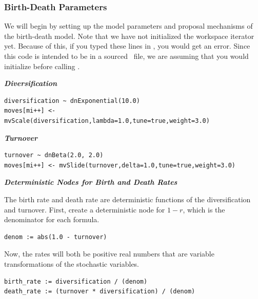 
\subsubsection{Birth-Death Parameters}

We will begin by setting up the model parameters and proposal mechanisms of the birth-death model. 
Note that we have not initialized the workspace iterator  yet. 
Because of this, if you typed these lines in \RevBayes, you would get an error. 
Since this code is intended to be in a sourced \Rev~file, we are assuming that you would initialize  before calling .

\textbf{\textit{Diversification}}
{\tt \begin{snugshade*}
\begin{lstlisting}
diversification ~ dnExponential(10.0) 
moves[mi++] <- mvScale(diversification,lambda=1.0,tune=true,weight=3.0)
\end{lstlisting}
\end{snugshade*}}

\textbf{\textit{Turnover}}
{\tt \begin{snugshade*}
\begin{lstlisting}
turnover ~ dnBeta(2.0, 2.0) 
moves[mi++] <- mvSlide(turnover,delta=1.0,tune=true,weight=3.0)
\end{lstlisting}
\end{snugshade*}}

\textbf{\textit{Deterministic Nodes for Birth and Death Rates}}

The birth rate and death rate are deterministic functions of the diversification and turnover.
First, create a deterministic node for $1 - r$, which is the denominator for each formula.

{\tt \begin{snugshade*}
\begin{lstlisting}
denom := abs(1.0 - turnover) 
\end{lstlisting}
\end{snugshade*}}

Now, the rates will both be positive real numbers that are variable transformations of the stochastic variables.
{\tt \begin{snugshade*}
\begin{lstlisting}
birth_rate := diversification / (denom)
death_rate := (turnover * diversification) / (denom)
\end{lstlisting}
\end{snugshade*}}

